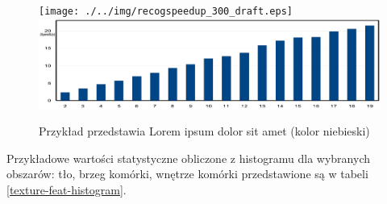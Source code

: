 \begin{figure} [htb]
\centering
\ifx\imagesversion\imagesdraft
	\texttt{[image: ./../img/recogspeedup\_300\_draft.eps]}
\else
	\includegraphics[width=12cm]{./../img/recogspeedup_300.eps}
\fi
\caption{Przykład przedstawia Lorem ipsum dolor sit amet (kolor niebieski)}
\label{class_selection}
\end{figure}

Przykładowe wartości statystyczne obliczone z histogramu dla wybranych obszarów: tło, brzeg komórki, wnętrze komórki przedstawione są w tabeli \ref{texture-feat-histogram}.
